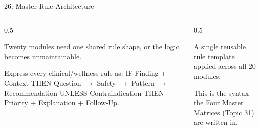 \documentclass[9pt,aspectratio=169]{beamer}
\begin{document}
\begin{frame}{26. Master Rule Architecture}
\begin{columns}[T,onlytextwidth]
\begin{column}{0.5\textwidth}
\begin{tcolorbox}[colback=blue!7,colframe=blue!55!black,title=\textbf{Motivation},boxrule=0.6pt,arc=1mm,left=5pt,right=5pt,top=3pt,bottom=3pt,fonttitle=\small]
\footnotesize Twenty modules need one shared rule shape, or the logic becomes unmaintainable.
\end{tcolorbox}
\vspace{5pt}
\begin{tcolorbox}[colback=teal!7,colframe=teal!55!black,title=\textbf{Method},boxrule=0.6pt,arc=1mm,left=5pt,right=5pt,top=3pt,bottom=3pt,fonttitle=\small]
\footnotesize Express every clinical/wellness rule as: IF Finding + Context THEN Question $\to$ Safety $\to$ Pattern $\to$ Recommendation UNLESS Contraindication THEN Priority + Explanation + Follow-Up.
\end{tcolorbox}
\end{column}
\begin{column}{0.5\textwidth}
\begin{tcolorbox}[colback=green!8,colframe=green!45!black,title=\textbf{Result},boxrule=0.6pt,arc=1mm,left=5pt,right=5pt,top=3pt,bottom=3pt,fonttitle=\small]
\footnotesize A single reusable rule template applied across all 20 modules.
\end{tcolorbox}
\vspace{5pt}
\begin{tcolorbox}[colback=orange!10,colframe=orange!65!black,title=\textbf{Conclusion},boxrule=0.6pt,arc=1mm,left=5pt,right=5pt,top=3pt,bottom=3pt,fonttitle=\small]
\footnotesize This is the syntax the Four Master Matrices (Topic 31) are written in.
\end{tcolorbox}
\end{column}
\end{columns}
\end{frame}
\end{document}
